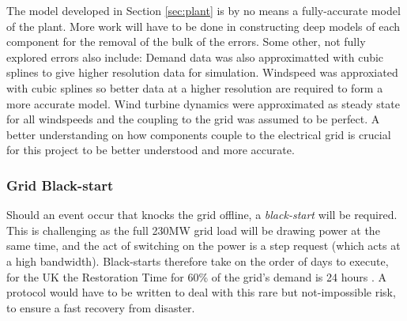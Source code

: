 The model developed in Section \ref{sec:plant} is by no means a fully-accurate model of the plant.
More work will have to be done in constructing deep models of each component for the removal of the bulk of the errors.
Some other, not fully explored errors also include:
Demand data was also approximatted with cubic splines to give higher resolution data for simulation.
Windspeed was approxiated with cubic splines so better data at a higher resolution are required to form a more accurate model.
Wind turbine dynamics were approximated as steady state for all windspeeds and the coupling to the grid was assumed to be perfect.
A better understanding on how components couple to the electrical grid is crucial for this project to be better understood and more accurate.

\subsubsection{Grid Black-start}
\label{sec:challengespwr}

Should an event occur that knocks the grid offline, a \emph{black-start} will be required.
This is challenging as the full 230MW grid load will be drawing power at the same time, and the act of switching on the power is a step request (which acts at a high bandwidth).
Black-starts therefore take on the order of days to execute, for the UK the Restoration Time for 60\% of the grid's demand is 24 hours \cite{power:natgridblack}.
A protocol would have to be written to deal with this rare but not-impossible risk, to ensure a fast recovery from disaster.
